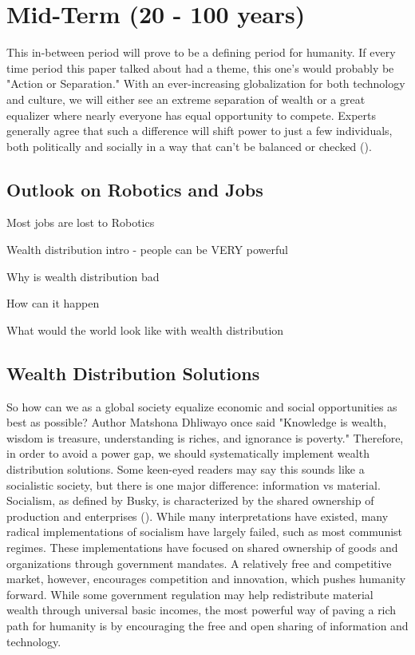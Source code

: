 \section{Mid-Term (20 - 100 years)}
\label{sec:mid}
This in-between period will prove to be a defining period for humanity. If every time period this paper talked about had a theme, this one's would probably be "Action or Separation." With an ever-increasing globalization for both technology and culture, we will either see an extreme separation of wealth or a great equalizer where nearly everyone has equal opportunity to compete. Experts generally agree that such a difference will shift power to just a few individuals, both politically and socially in a way that can't be balanced or checked (\cite{WhatsWrongWithWealthDistribution}).

\subsection{Outlook on Robotics and Jobs}

Most jobs are lost to Robotics

Wealth distribution intro - people can be VERY powerful

Why is wealth distribution bad

How can it happen

What would the world look like with wealth distribution

\subsection{Wealth Distribution Solutions}

So how can we as a global society equalize economic and social opportunities as best as possible? Author Matshona Dhliwayo once said "Knowledge is wealth, wisdom is treasure, understanding is riches, and ignorance is poverty." %
Therefore, in order to avoid a power gap, we should systematically implement wealth distribution solutions. Some keen-eyed readers may say this sounds like a socialistic society, but there is one major difference: information vs material. Socialism, as defined by Busky, is characterized by the shared ownership of production and enterprises (\cite{WhatIsSocialism}). While many interpretations have existed, many radical implementations of socialism have largely failed, such as most communist regimes. These implementations have focused on shared ownership of goods and organizations through government mandates. A relatively free and competitive market, however, encourages competition and innovation, which pushes humanity forward. While some government regulation may help redistribute material wealth through universal basic incomes, the most powerful way of paving a rich path for humanity is by encouraging the free and open sharing of information and technology.

